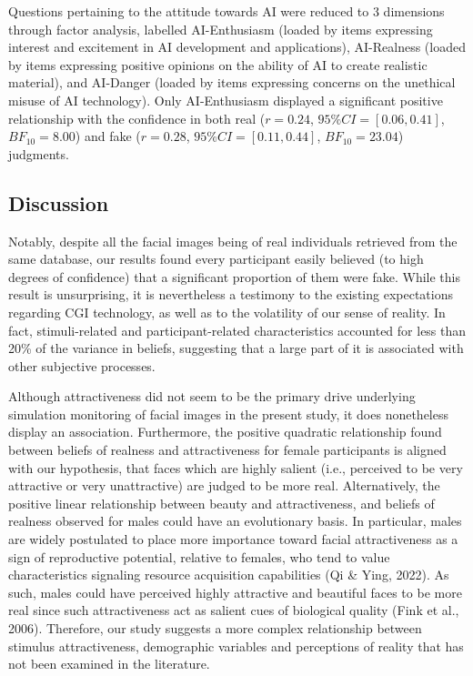 \documentclass[
  man,floatsintext]{apa6}
\begin{document}
Questions pertaining to the attitude towards AI were reduced to 3 dimensions through factor analysis, labelled AI-Enthusiasm (loaded by items expressing interest and excitement in AI development and applications), AI-Realness (loaded by items expressing positive opinions on the ability of AI to create realistic material), and AI-Danger (loaded by items expressing concerns on the unethical misuse of AI technology). Only AI-Enthusiasm displayed a significant positive relationship with the confidence in both real (\(r = 0.24\), \(95\% CI = [0.06, 0.41]\), \(BF_{10} = 8.00\)) and fake (\(r = 0.28\), \(95\% CI = [0.11, 0.44]\), \(BF_{10} = 23.04\)) judgments.

\hypertarget{discussion}{%
\subsection{Discussion}\label{discussion}}

Notably, despite all the facial images being of real individuals retrieved from the same database, our results found every participant easily believed (to high degrees of confidence) that a significant proportion of them were fake. While this result is unsurprising, it is nevertheless a testimony to the existing expectations regarding CGI technology, as well as to the volatility of our sense of reality. In fact, stimuli-related and participant-related characteristics accounted for less than 20\% of the variance in beliefs, suggesting that a large part of it is associated with other subjective processes.

Although attractiveness did not seem to be the primary drive underlying simulation monitoring of facial images in the present study, it does nonetheless display an association. Furthermore, the positive quadratic relationship found between beliefs of realness and attractiveness for female participants is aligned with our hypothesis, that faces which are highly salient (i.e., perceived to be very attractive or very unattractive) are judged to be more real. Alternatively, the positive linear relationship between beauty and attractiveness, and beliefs of realness observed for males could have an evolutionary basis. In particular, males are widely postulated to place more importance toward facial attractiveness as a sign of reproductive potential, relative to females, who tend to value characteristics signaling resource acquisition capabilities (Qi \& Ying, 2022). As such, males could have perceived highly attractive and beautiful faces to be more real since such attractiveness act as salient cues of biological quality (Fink et al., 2006). Therefore, our study suggests a more complex relationship between stimulus attractiveness, demographic variables and perceptions of reality that has not been examined in the literature.
\end{document}
